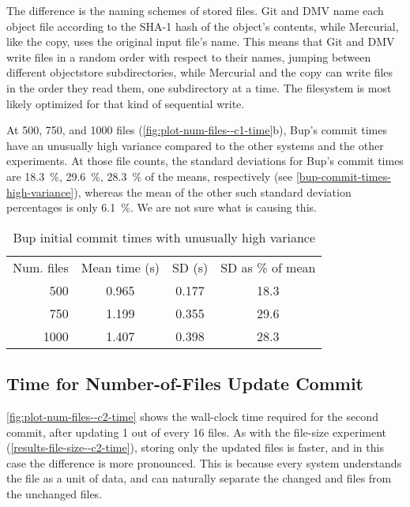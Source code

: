 The difference is the naming schemes of stored files. Git and DMV name each
object file according to the SHA-1 hash of the object's contents, while
Mercurial, like the copy, uses the original input file's name. This means that
Git and DMV write files in a random order with respect to their names, jumping
between different \gls{objectstore} subdirectories, while Mercurial and the copy
can write files in the order they read them, one subdirectory at a time. The
filesystem is most likely optimized for that kind of sequential write.

At \num{500}, \num{750}, and \num{1000} files
(\autoref{fig:plot-num-files--c1-time}b), Bup's commit times have an unusually
high variance compared to the other systems and the other experiments. At those
file counts, the standard deviations for Bup's commit times are
\SI{18.3}{\percent}, \SI{29.6}{\percent}, \SI{28.3}{\percent} of the means,
respectively (see \autoref{bup-commit-times-high-variance}), whereas the mean of
the other such standard deviation percentages is only \SI{6.1}{\percent}. We are
not sure what is causing this.

\begin{table}[b]
    \caption{Bup initial commit times with unusually high variance}
    \label{bup-commit-times-high-variance}
    \centering
    \begin{tabular}{rccc}
        Num. files & Mean time (s) & SD (s) & SD as \% of mean \\
           500  &   0.965  &   0.177  &  18.3 \\
           750  &   1.199  &   0.355  &  29.6 \\
          1000  &   1.407  &   0.398  &  28.3 \\
    \end{tabular}
\end{table}

%


\cleardoublepage
\subsection{Time for Number-of-Files Update Commit}

\autoref{fig:plot-num-files--c2-time} shows the wall-clock time required for the
second \gls{commit}, after updating \num{1} out of every \num{16} files. As with
the file-size experiment (\autoref{results-file-size--c2-time}), storing only
the updated files is faster, and in this case the difference is more pronounced.
This is because every system understands the file as a unit of data, and can
naturally separate the changed and files from the unchanged files.

